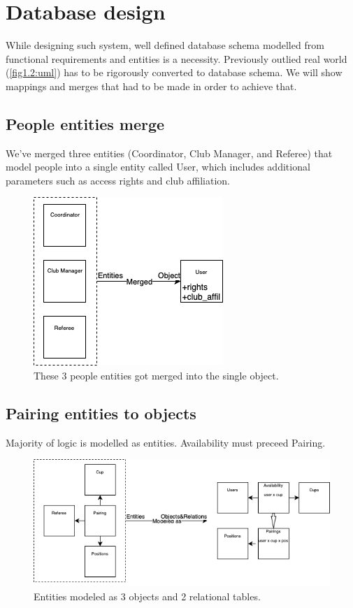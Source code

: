 \section{Database design}
While designing such system, well defined database schema modelled from functional requirements and entities is a necessity. Previously outlied real world (\autoref{fig1.2:uml}) has to be rigorously converted to database schema. We will show mappings and merges that had to be made in order to achieve that.
\subsection*{People entities merge}
We've merged three entities (Coordinator, Club Manager, and Referee) that model people into a single entity called User, which includes additional parameters such as access rights and club affiliation.
\begin{figure}[h]	
	\centering	
    \includegraphics[scale=0.5]{img/entities_to_user.png}
	\caption{These 3 people entities got merged into the single object.}
	\label{fig2.6:enttousr}
\end{figure}
\subsection*{Pairing entities to objects}
Majority of logic is modelled as entities. Availability must preceed Pairing.
\begin{figure}[h]	
	\centering	
    \includegraphics[scale=0.5]{img/entities_pairing_to_obj_rels.png}
	\caption{Entities modeled as 3 objects and 2 relational tables.}
	\label{fig2.7:entrels}
\end{figure}
